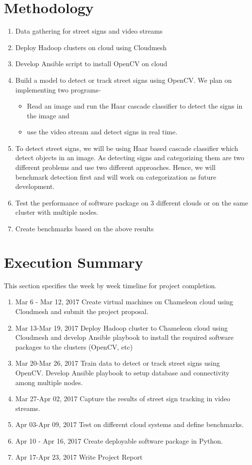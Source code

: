 \documentclass[9pt,twocolumn,twoside]{styles/osajnl}
\begin{document}
\section{Methodology}
\begin{enumerate}
\item Data gathering for street signs and video streams
\item Deploy Hadoop clusters on cloud using Cloudmesh
\item Develop Ansible script to install OpenCV on cloud
\item Build a model to detect or track street signs using OpenCV. We
  plan on implementing two programs-
    \begin{itemize}
    \item Read an image and run the Haar cascade classifier to detect
      the signs in the image and
    \item use the video stream and detect signs in real time.
    \end{itemize}
\item To detect street signs, we will be using Haar based cascade
  classifier which detect objects in an image. As detecting signs and
  categorizing them are two different problems and use two different
  approaches. Hence, we will benchmark detection first and will work
  on categorization as future development.
\item Test the performance of software package on 3 different clouds
  or on the same cluster with multiple nodes.
\item Create benchmarks based on the above results

\end{enumerate}


\section{Execution Summary}
This section specifies the week by week timeline for project
completion.
\begin{enumerate}
\item {Mar 6 - Mar 12, 2017} Create virtual machines on Chameleon
  cloud using Cloudmesh and submit the project proposal.
\item {Mar 13-Mar 19, 2017} Deploy Hadoop cluster to Chameleon cloud
  using Cloudmesh and develop Ansible playbook to install the required
  software packages to the clusters (OpenCV, etc)
\item {Mar 20-Mar 26, 2017} Train data to detect or track street signs
  using OpenCV. Develop Ansible playbook to setup database and
  connectivity among multiple nodes.
\item {Mar 27-Apr 02, 2017} Capture the results of street sign
  tracking in video streams.
\item {Apr 03-Apr 09, 2017} Test on different cloud systems and define
  benchmarks.
\item {Apr 10 - Apr 16, 2017} Create deployable software package in
  Python.
\item {Apr 17-Apr 23, 2017} Write Project Report
\end{enumerate}
\end{document}
